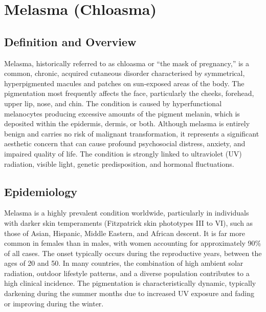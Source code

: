 \chapter{Melasma (Chloasma)}

\section*{Definition and Overview}
Melasma, historically referred to as chloasma or ``the mask of pregnancy,'' is a common, chronic, acquired cutaneous disorder characterised by symmetrical, hyperpigmented macules and patches on sun-exposed areas of the body. The pigmentation most frequently affects the face, particularly the cheeks, forehead, upper lip, nose, and chin. The condition is caused by hyperfunctional melanocytes producing excessive amounts of the pigment melanin, which is deposited within the epidermis, dermis, or both. Although melasma is entirely benign and carries no risk of malignant transformation, it represents a significant aesthetic concern that can cause profound psychosocial distress, anxiety, and impaired quality of life. The condition is strongly linked to ultraviolet (UV) radiation, visible light, genetic predisposition, and hormonal fluctuations.

\section*{Epidemiology}
Melasma is a highly prevalent condition worldwide, particularly in individuals with darker skin temperaments (Fitzpatrick skin phototypes III to VI), such as those of Asian, Hispanic, Middle Eastern, and African descent. It is far more common in females than in males, with women accounting for approximately 90\% of all cases. The onset typically occurs during the reproductive years, between the ages of 20 and 50. In many countries, the combination of high ambient solar radiation, outdoor lifestyle patterns, and a diverse population contributes to a high clinical incidence. The pigmentation is characteristically dynamic, typically darkening during the summer months due to increased UV exposure and fading or improving during the winter.

